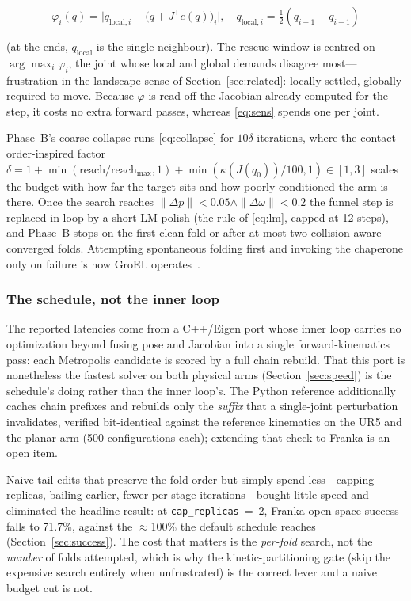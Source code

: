\documentclass[10pt,conference]{IEEEtran}
\newcommand{\tp}{^{\mathsf{T}}}                       %
\begin{document}
\begin{equation}
\varphi_i(q) = \big| q_{\mathrm{local},i} - \big(q + J\tp e(q)\big)_i \big|,
\quad q_{\mathrm{local},i} = \tfrac{1}{2}(q_{i-1} + q_{i+1})
\label{eq:phi}
\end{equation}

(at the ends, $q_{\mathrm{local}}$ is the single neighbour). The rescue window is
centred on $\arg\max_i \varphi_i$, the joint whose local and global demands
disagree most---frustration in the landscape sense of
Section~\ref{sec:related}: locally settled, globally required to move. Because
$\varphi$ is read off the Jacobian already computed for the step, it costs no
extra forward passes, whereas \eqref{eq:sens} spends one per joint.

Phase~B's coarse collapse runs \eqref{eq:collapse} for $10\delta$ iterations,
where the contact-order-inspired factor
$\delta = 1 + \min(\mathrm{reach}/\mathrm{reach}_{\max}, 1)
+ \min(\kappa(J(q_0))/100, 1) \in [1,3]$ scales the budget with how far the
target sits and how poorly conditioned the arm is there. Once the search reaches
$\|\Delta p\| < 0.05 \wedge \|\Delta\omega\| < 0.2$ the funnel step is replaced
in-loop by a short LM polish (the rule of \eqref{eq:lm}, capped at 12 steps), and
Phase~B stops on the first clean fold or after at most two collision-aware
converged folds. Attempting spontaneous folding first and invoking the chaperone
only on failure is how GroEL operates~\cite{b31}.

\subsubsection{The schedule, not the inner loop}
\label{sec:schedule}
The reported latencies come from a C++/Eigen port whose inner loop carries no
optimization beyond fusing pose and Jacobian into a single forward-kinematics
pass: each Metropolis candidate is scored by a full chain rebuild. That this port
is nonetheless the fastest solver on both physical arms
(Section~\ref{sec:speed}) is the schedule's doing rather than the inner loop's.
The Python reference additionally caches chain prefixes and rebuilds only the
\emph{suffix} that a single-joint perturbation invalidates, verified
bit-identical against the reference kinematics on the UR5 and the planar arm (500
configurations each); extending that check to Franka is an open item.

Naive tail-edits that preserve the fold order but simply spend less---capping
replicas, bailing earlier, fewer per-stage iterations---bought little speed and
eliminated the headline result: at \texttt{cap\_replicas}~=~2, Franka open-space
success falls to 71.7\%, against the $\approx$100\% the default schedule reaches
(Section~\ref{sec:success}). The cost that matters is the \emph{per-fold} search,
not the \emph{number} of folds attempted, which is why the kinetic-partitioning
gate (skip the expensive search entirely when unfrustrated) is the correct lever
and a naive budget cut is not.
\end{document}
